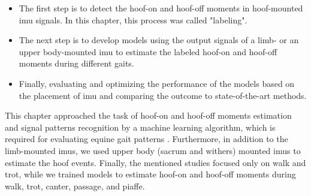 \begin{itemize}
    \item The first step is to detect the hoof-on and hoof-off moments in hoof-mounted \gls{imu} signals. In this chapter, this process was called "labeling".
    \item The next step is to develop models using the output signals of a limb- or an upper body-mounted \gls{imu} to estimate the labeled hoof-on and hoof-off moments during different gaits. 
\item Finally, evaluating and optimizing the performance of the models based on the placement of \gls{imu} and comparing the outcome to state-of-the-art methods.


\end{itemize}

This chapter approached the task of hoof-on and hoof-off moments estimation and signal patterns recognition by a machine learning algorithm, which is required for evaluating equine gait patterns \cite{mouloodi_2021_what}. Furthermore, in addition to the limb-mounted \gls{imu}s, we used upper body (sacrum and withers) mounted \gls{imu}s to estimate the hoof events. Finally, the mentioned studies focused only on walk and trot, while we trained models to estimate hoof-on and hoof-off moments during walk, trot, canter, passage, and piaffe.